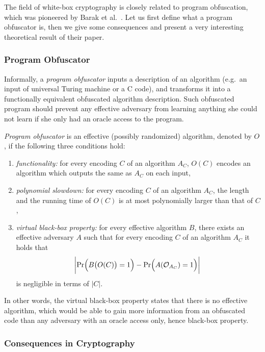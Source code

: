 The field of white-box cryptography is closely related to program obfuscation, which was pioneered by Barak et al.\ \cite{barak2001possibility}. Let us first define what a program obfuscator is, then we give some consequences and present a very interesting theoretical result of their paper.

\subsubsection{Program Obfuscator}
	
	Informally, a {\em program obfuscator} inputs a description of an algorithm (e.g.\ an input of universal Turing machine or a C code), and transforms it into a functionally equivalent obfuscated algorithm description. Such obfuscated program should prevent any effective adversary from learning anything she could not learn if she only had an oracle access to the program.
	
	\begin{defn}
	\label{def:obfus}
		{\em Program obfuscator} is an effective (possibly randomized) algorithm, denoted by $O$, if the following three conditions hold:
		\begin{enumerate}
			\item {\em functionality:} for every encoding $C$ of an algorithm $A_C$, $O(C)$ encodes an algorithm which outputs the same as $A_C$ on each input,
			\item {\em polynomial slowdown:} for every encoding $C$ of an algorithm $A_C$, the length and the running time of $O(C)$ is at most polynomially larger than that of $C$,
			\item {\em virtual black-box property:} for every effective algorithm $B$, there exists an effective adversary $A$ such that for every encoding $C$ of an algorithm $A_C$ it holds that
			\[
				\biggl| \Pr\Bigl(B\bigl(O(C)\bigr)=1\Bigr) - \Pr\Bigl(A({\cal O}_{A_C})=1\Bigr) \biggr| \
			\]
			is negligible in terms of $|C|$.
		\end{enumerate}
	\end{defn}
	
	In other words, the virtual black-box property states that there is no effective algorithm, which would be able to gain more information from an obfuscated code than any adversary with an oracle access only, hence black-box property.

\subsubsection{Consequences in Cryptography}
	
